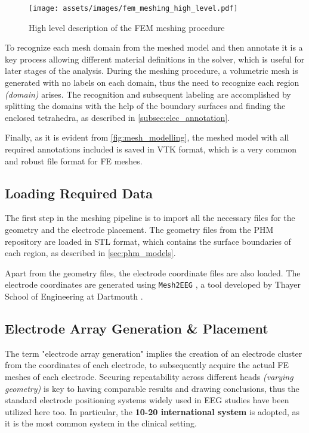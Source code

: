 \begin{figure}[H]
    \centering
    \texttt{[image: assets/images/fem\_meshing\_high\_level.pdf]}
    \caption{High level description of the \gls{FEM} meshing procedure}
    \label{fig:mesh_modelling}
\end{figure}

\noindent To recognize each mesh domain from the meshed model and then annotate it is a key process allowing different material definitions in the solver, which is useful for later stages of the analysis. During the meshing procedure, a volumetric mesh is generated with no labels on each domain, thus the need to recognize each region \textit{(domain)} arises. The recognition and subsequent labeling are accomplished by splitting the domains with the help of the boundary surfaces and finding the enclosed tetrahedra, as described in \ref{subsec:elec_annotation}.

Finally, as it is evident from \autoref{fig:mesh_modelling}, the meshed model with all required annotations included is saved in \gls{VTK} format, which is a very common and robust file format for \gls{FE} meshes.

\subsection{Loading Required Data}

The first step in the meshing pipeline is to import all the necessary files for the geometry and the electrode placement. The geometry files from the \gls{PHM} repository \cite{ErikG.Lee2016} are loaded in \gls{STL} format, which contains the surface boundaries of each region, as described in \ref{sec:phm_models}.

Apart from the geometry files, the electrode coordinate files are also loaded. The electrode coordinates are generated using \texttt{Mesh2EEG} \cite{Giacometti2014}, a tool developed by Thayer School of Engineering at Dartmouth \cite{mesh2eeg_web}.

\subsection{Electrode Array Generation \& Placement}
\label{subsec:elec_placement}

The term "electrode array generation" implies the creation of an electrode cluster from the coordinates of each electrode, to subsequently acquire the actual \gls{FE} meshes of each electrode. Securing repeatability across different heads \textit{(varying geometry)} is key to having comparable results and drawing conclusions, thus the standard electrode positioning systems widely used in \gls{EEG} studies have been utilized here too. In particular, the \textbf{10-20 international system} \cite[chapter 13]{Malmivuo1995} is adopted, as it is the most common system in the clinical setting. 

